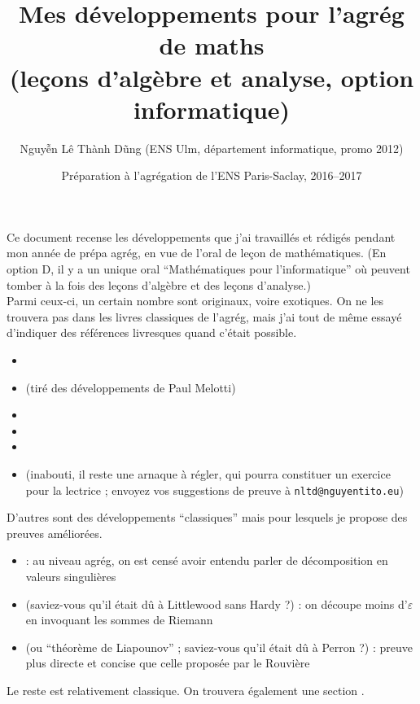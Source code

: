 \documentclass[a4paper, 11pt]{article}
\begin{document}
\title{Mes développements pour l'agrég de maths\\
  (leçons d'algèbre et analyse, option informatique)}
\author{Nguyễn Lê Thành Dũng (ENS Ulm, département informatique, promo 2012)}
\date{Préparation à l'agrégation de l'ENS Paris-Saclay, 2016--2017}
\maketitle

Ce document recense les développements que j'ai travaillés et rédigés pendant mon
année de prépa agrég, en vue de l'oral de leçon de mathématiques. (En option D,
il y a un unique oral \enquote{Mathématiques pour l'informatique} où peuvent
tomber à la fois des leçons d'algèbre et des leçons d'analyse.)\\

Parmi ceux-ci, un certain nombre sont originaux, voire exotiques. On ne les
trouvera pas dans les livres classiques de l'agrég, mais j'ai tout de même
essayé d'indiquer des références livresques quand c'était possible.
\begin{itemize}
\item {}
\item {} (tiré des développements de Paul Melotti)
\item {}
\item {}
\item {}
\item {} (inabouti, il reste une arnaque à régler, qui pourra
  constituer un exercice pour la lectrice ; envoyez vos suggestions de preuve à
  \texttt{nltd@nguyentito.eu})
\end{itemize}
D'autres sont des développements \enquote{classiques} mais pour lesquels je
propose des preuves améliorées.
\begin{itemize}
\item {} : au niveau agrég, on est censé avoir entendu parler
  de décomposition en valeurs singulières
\item {} (saviez-vous qu'il était dû à Littlewood sans Hardy ?) :
  on découpe moins d'$\varepsilon$ en invoquant les sommes de Riemann
\item {} (ou \enquote{théorème de Liapounov} ; saviez-vous qu'il
  était dû à Perron ?) : preuve plus
  directe et concise que celle proposée par le Rouvière
\end{itemize}
Le reste est relativement classique.
On trouvera également une section .\\
\end{document}
